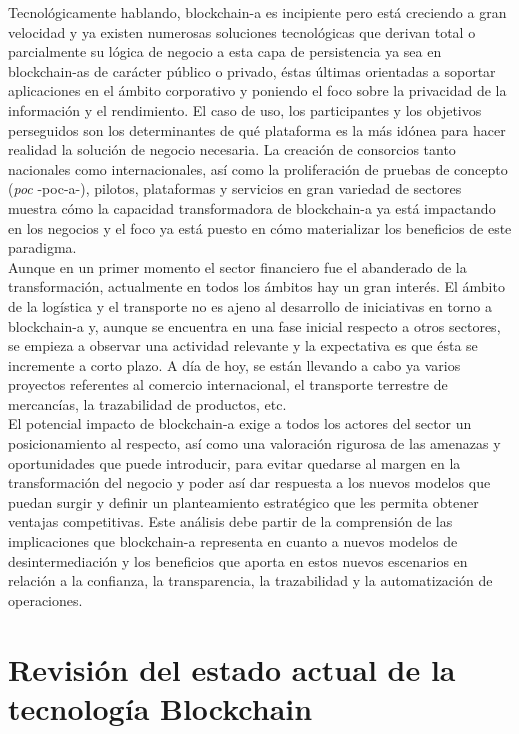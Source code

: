 \documentclass[12pt,a4paper, twoside]{report}
\begin{document}
	Tecnológicamente hablando, \gls{blockchain-a} es incipiente pero está creciendo a gran velocidad y ya existen numerosas soluciones tecnológicas que derivan total o parcialmente su lógica de negocio a esta capa de persistencia ya sea en \glspl{blockchain-a} de carácter público o privado, éstas últimas orientadas a soportar aplicaciones en el ámbito corporativo y poniendo el foco sobre la privacidad de la información y el rendimiento. El caso de uso, los participantes y los objetivos perseguidos son los determinantes de qué plataforma es la más idónea para hacer realidad la solución de negocio necesaria. La creación de consorcios tanto nacionales como internacionales, así como la proliferación de pruebas de concepto (\textit{\gls{poc}} -\gls{poc-a}-), pilotos, plataformas y servicios en gran variedad de sectores muestra cómo la capacidad transformadora de \gls{blockchain-a} ya está impactando en los negocios y el foco ya está puesto en cómo materializar los beneficios de este paradigma. \\
	
	Aunque en un primer momento el sector financiero fue el abanderado de la transformación, actualmente en todos los ámbitos hay un gran interés. El ámbito de la logística y el transporte no es ajeno al desarrollo de iniciativas en torno a \gls{blockchain-a} y, aunque se encuentra en una fase inicial respecto a otros sectores, se empieza a observar una actividad relevante y la expectativa es que ésta se incremente a corto plazo. A día de hoy, se están llevando a cabo ya varios proyectos referentes al comercio internacional, el transporte terrestre de mercancías, la trazabilidad de productos, etc. \\

	El potencial impacto de \gls{blockchain-a} exige a todos los actores del sector un posicionamiento al respecto, así como una valoración rigurosa de las amenazas y oportunidades que puede introducir, para evitar quedarse al margen en la transformación del negocio y poder así dar respuesta a los nuevos modelos que puedan surgir y definir un planteamiento estratégico que les permita obtener ventajas competitivas. Este análisis debe partir de la comprensión de las implicaciones que \gls{blockchain-a} representa en cuanto a nuevos modelos de desintermediación y los beneficios que aporta en estos nuevos escenarios en relación a la confianza, la transparencia, la trazabilidad y la automatización de operaciones.
	
	\section{Revisión del estado actual de la tecnología Blockchain}
	
\end{document}
